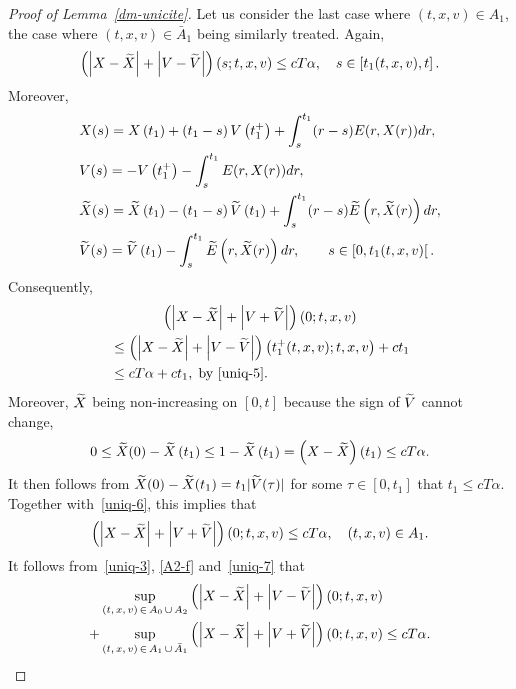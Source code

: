 \documentclass[10pt]{amsart}
\theoremstyle{definition}\newtheorem{defi}[theo]{Definition}\newtheorem{rema}[theo]{Remark}\newtheorem{exam}[theo]{Example}\newtheorem{exem}[theo]{Example}\newtheorem{nota}[theo]{Notation}
\let\oldtilde\tilde
\renewcommand*{\tilde}[1]{\mathchoice{\widetilde{#1}}{\widetilde{#1}}{\oldtilde{#1}}{\oldtilde{#1}}}
\begin{document}
\begin{proof}[{Proof of Lemma~\ref{dm-unicite}}]
Let us consider the last case where $(t,x,v)\in A_1$, the case where $(t,x,v)\in \bar{A}_1$ being similarly treated. Again,
\begin{equation}\label{uniq-5}
\left (\left|X-\tilde{X}\right|+\left|V-\tilde{V}\right| \right) (s;t,x,v) \leq cT\alpha, \quad s \in \left[t_1(t,x,v),t\right].
\end{equation}
Moreover,
\begin{align*}
&X(s)= X\left(t_1\right)+ \left(t_1-s\right)V\left(t_1^+\right)+\int_s^{t_1} (r-s)E(r,X(r)) dr, \\
& V(s)= -V\left(t_1^+\right)-\int_s^{t_1} E(r,X(r)) dr, \\
&\tilde{X}(s)= \tilde{X}\left(t_1\right)-\left(t_1-s\right)\tilde{V}\left(t_1\right)+\int_s^{t_1} (r-s)\tilde{E}\left(r,\tilde{X}(r)\right) dr, \\
&\tilde{V}(s)= \tilde{V}\left(t_1\right)-\int_s^{t_1} \tilde{E}\left(r,\tilde{X}(r)\right) dr,\qquad s\in \left[0,t_1(t,x,v)\right[.
\end{align*}
Consequently,
\begin{multline}\label{uniq-6}
\left (\left|X-\tilde{X}\right|+\left|V+\tilde{V}\right| \right)(0;t,x,v)\\
\begin{aligned}
&\leq \left(\left|X-\tilde{X}\right|+\left|V-\tilde{V}\right| \right)\left(t_1^+(t,x,v); t,x,v\right)+ct_1\\
&\leq cT\alpha +ct_1,\; \text{by }\eqref{uniq-5}.
\end{aligned}
\end{multline}
Moreover, $\tilde{X}$ being non-increasing on $[0,t]$ because the sign of $\tilde{V}$ cannot change,
\[
0 \leq \tilde{X}(0)-\tilde{X}\left(t_1\right)\leq 1-\tilde{X}\left(t_1\right)=\left(X-\tilde{X}\right)\left(t_1\right) \leq cT\alpha.
\]
It then follows from $\tilde{X}(0)-\tilde{X}(t_1)= t_1 |\tilde{V}(\tau)|$ for some $\tau \in [0,t_1]$ that $t_1\leq cT\alpha $. Together with~\eqref{uniq-6}, this implies that
\begin{equation}\label{uniq-7}
\left (\left|X-\tilde{X}\right|+\left|V+\tilde{V}\right| \right)(0;t,x,v) \leq cT\alpha, \quad (t,x,v)\in A_1.
\end{equation}
It follows from~\eqref{uniq-3}, \eqref{A2-f} and~\eqref{uniq-7} that
\begin{align*}
&\sup_{(t,\,x,\,v)\,\in\,A_0\,\cup\,A_2} \left(\left|X-\tilde{X}\right|+\left|V-\tilde{V}\right|\right)(0;t,x,v) \\
+ &\sup_{(t,\,x,\,v)\,\in\,A_1\,\cup\,\bar{A}_1} \left(\left|X-\tilde{X}\right|+\left|V+\tilde{V}\right|\right)(0;t,x,v) \leq cT\alpha.

\end{align*}
\end{proof}
\end{document}
